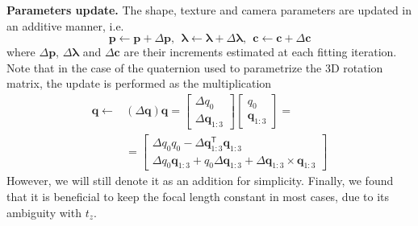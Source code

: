 %
\textbf{Parameters update.} The shape, texture and camera parameters are updated
in an additive manner, i.e.
%
\begin{equation}
\mathbf{p}\leftarrow\mathbf{p}+\Delta\mathbf{p},~~\boldsymbol{\lambda}\leftarrow\boldsymbol{\lambda}+\Delta\boldsymbol{\lambda},~~\mathbf{c}\leftarrow\mathbf{c}+\Delta\mathbf{c}
\end{equation}
%
where $\Delta\mathbf{p}$, $\Delta\boldsymbol{\lambda}$ and $\Delta\mathbf{c}$
are their increments estimated at each fitting iteration. 
Note that in the case of the quaternion
used to parametrize the 3D rotation matrix, the update is performed as the
multiplication
%
\begin{equation}
\begin{aligned}
\mathbf{q}\leftarrow & (\Delta\mathbf{q})\mathbf{q} =
\left[\begin{array}{c}\Delta q_0\\\Delta\mathbf{q}_{1:3}\end{array}\right]
\left[\begin{array}{c}q_0\\\mathbf{q}_{1:3}\end{array}\right] = \\
& = \left[\begin{array}{c}\Delta q_0 q_0 - \Delta\mathbf{q}_{1:3}^\mathsf{T}\mathbf{q}_{1:3}\\ \Delta q_0\mathbf{q}_{1:3} + q_0\Delta\mathbf{q}_{1:3}+\Delta\mathbf{q}_{1:3}\times\mathbf{q}_{1:3}\end{array}\right]
\end{aligned}
\end{equation}
%
However, we will still denote it as an addition for simplicity. Finally, we found that it is beneficial to keep the focal length constant in most cases, due to its ambiguity with $t_z$.


